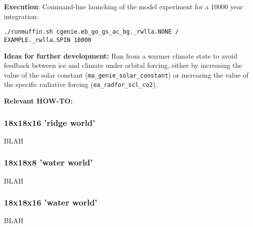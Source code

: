 \documentclass[10pt,twoside]{article}
\begin{document}
\noindent \textbf{Execution}: Command-line launching of the model experiment for a 10000 year integration:
\vspace{-10pt}\begin{verbatim}./runmuffin.sh cgenie.eb_go_gs_ac_bg._rwlla.NONE /
EXAMPLE._rwlla.SPIN 10000\end{verbatim}\vspace{-10pt}

\noindent \textbf{Ideas for further development:} 
Run from a warmer climate state to avoid feedback between ice and climate under orbital forcing, either by increasing the value of the solar constant (\texttt{ma\_genie\_solar\_constant}) or increasing the value of the specific radiative forcing (\texttt{ea\_radfor\_scl\_co2}).

\noindent \textbf{Relevant HOW-TO:} 


\subsubsection{18x18x16 'ridge world'}\label{EXAMPLE.rwlma.SPIN}

BLAH


\subsubsection{18x18x8 'water world'}\label{EXAMPLE.wwlla.SPIN}

BLAH


\subsubsection{18x18x16 'water world'}\label{EXAMPLE.wwlma.SPIN}

BLAH
        
\end{document}
